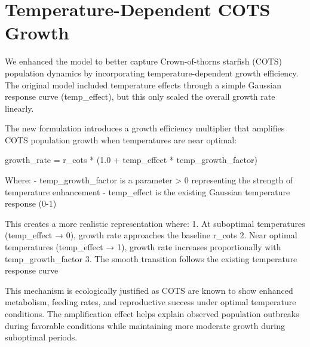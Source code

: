 \section{Temperature-Dependent COTS Growth}

We enhanced the model to better capture Crown-of-thorns starfish (COTS) population dynamics by incorporating temperature-dependent growth efficiency. The original model included temperature effects through a simple Gaussian response curve (temp\_effect), but this only scaled the overall growth rate linearly.

The new formulation introduces a growth efficiency multiplier that amplifies COTS population growth when temperatures are near optimal:

growth\_rate = r\_cots * (1.0 + temp\_effect * temp\_growth\_factor)

Where:
- temp\_growth\_factor is a parameter > 0 representing the strength of temperature enhancement
- temp\_effect is the existing Gaussian temperature response (0-1)

This creates a more realistic representation where:
1. At suboptimal temperatures (temp\_effect → 0), growth rate approaches the baseline r\_cots
2. Near optimal temperatures (temp\_effect → 1), growth rate increases proportionally with temp\_growth\_factor
3. The smooth transition follows the existing temperature response curve

This mechanism is ecologically justified as COTS are known to show enhanced metabolism, feeding rates, and reproductive success under optimal temperature conditions. The amplification effect helps explain observed population outbreaks during favorable conditions while maintaining more moderate growth during suboptimal periods.

